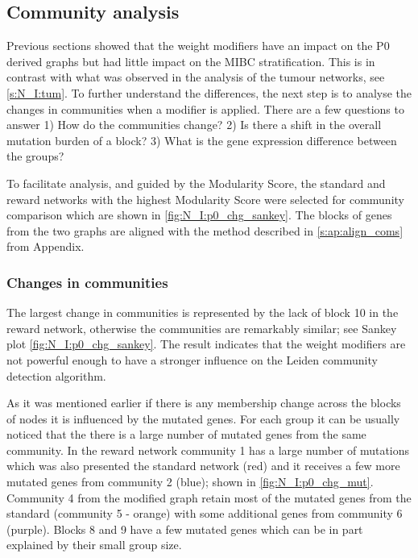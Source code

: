 \subsection{Community analysis} \label{s:N_I:com_analysis}

Previous sections showed that the weight modifiers have an impact on the P0 derived graphs but had little impact on the MIBC stratification. This is in contrast with what was observed in the analysis of the tumour networks, see \cref{s:N_I:tum}. To further understand the differences, the next step is to analyse the changes in communities when a modifier is applied. There are a few questions to answer 1) How do the communities change? 2) Is there a shift in the overall mutation burden of a block? 3) What is the gene expression difference between the groups? 

To facilitate analysis, and guided by the Modularity Score, the standard and reward networks with the highest Modularity Score were selected for community comparison which are shown in \cref{fig:N_I:p0_chg_sankey}. The blocks of genes from the two graphs are aligned with the method described in \cref{s:ap:align_coms} from Appendix.

\subsubsection*{Changes in communities}

The largest change in communities is represented by the lack of block 10 in the reward network, otherwise the communities are remarkably similar; see  Sankey plot \cref{fig:N_I:p0_chg_sankey}. The result indicates that the weight modifiers are not powerful enough to have a stronger influence on the Leiden community detection algorithm. 

As it was mentioned earlier if there is any membership change across the blocks of nodes it is influenced by the mutated genes. For each group it can be usually noticed that the there is a large number of mutated genes from the same community. In the reward network community 1 has a large number of mutations which was also presented the standard network (red) and it receives a few more mutated genes from community 2 (blue); shown in \cref{fig:N_I:p0_chg_mut}. Community 4 from the modified graph retain most of the mutated genes from the standard (community 5 - orange) with some additional genes from community 6 (purple). Blocks 8 and 9 have a few mutated genes which can be in part explained by their small group size. 

